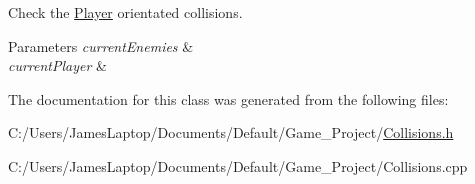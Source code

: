 Check the \hyperlink{class_player}{Player} orientated collisions. 


\begin{DoxyParams}{Parameters}
{\em current\+Enemies} & \\
\hline
{\em current\+Player} & \\
\hline
\end{DoxyParams}


The documentation for this class was generated from the following files\+:\begin{DoxyCompactItemize}
\item 
C\+:/\+Users/\+James\+Laptop/\+Documents/\+Default/\+Game\+\_\+\+Project/\hyperlink{_collisions_8h}{Collisions.\+h}\item 
C\+:/\+Users/\+James\+Laptop/\+Documents/\+Default/\+Game\+\_\+\+Project/Collisions.\+cpp\end{DoxyCompactItemize}
